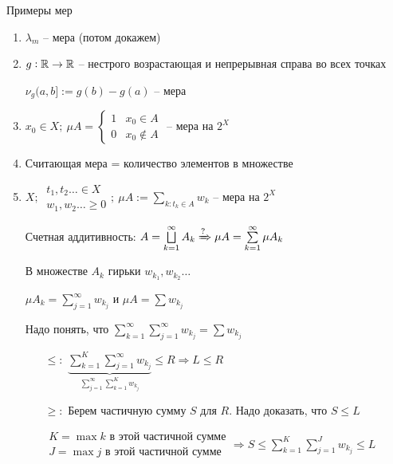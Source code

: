 \documentclass[12pt]{article}
\begin{document}
\begin{Example}{Примеры мер}
    \begin{enumerate}
        \item $\lambda_m$ -- мера (потом докажем)
        \item $g : \mathbb R \to \mathbb R$ -- нестрого возрастающая и непрерывная справа во всех точках
        
        $\nu_g(a, b] := g(b) - g(a)$ -- мера

        \item $x_0 \in X;\ \mu A = \begin{cases}
            1 & x_0 \in A \\
            0 & x_0 \notin A 
        \end{cases}$ -- мера на $2^X$

        \item Считающая мера = количество элементов в множестве
        \item $X;\ \begin{gathered}
            t_1, t_2 \ldots \in X \\
            w_1, w_2 \ldots \geq 0
        \end{gathered};\ \mu A := \sum\limits_{k : t_k \in A} w_k$ -- мера на $2^X$

        Счетная аддитивность: $A = \bigsqcup\limits_{k = 1}^\infty A_k \xRightarrow[]{?} \mu A = \sum\limits_{k = 1}^\infty \mu A_k$

        В множестве $A_k$ гирьки $w_{k_1}, w_{k_2} \ldots$

        $\mu A_k = \sum\limits_{j = 1}^\infty w_{k_j}$ и $\mu A = \sum w_{k_j}$
        
        Надо понять, что $\sum\limits_{k = 1}^\infty \sum\limits_{j = 1}^\infty w_{k_j} = \sum w_{k_j}$

        \begin{itemize}
            \item[$\leq :$] $\underbrace{\sum\limits_{k = 1}^K \sum\limits_{j = 1}^\infty w_{k_j}}_{\sum\limits_{j = 1}^\infty \sum\limits_{k = 1}^K w_{k_j}} \leq R \Rightarrow L \leq R$
            \item[$\geq :$] Берем частичную сумму $S$ для $R$. Надо доказать, что $S \leq L$
            
            $\begin{gathered}
                K = \max k \text{ в этой частичной сумме} \\
                J = \max j \text{ в этой частичной сумме}
            \end{gathered} \Rightarrow S \leq \sum\limits_{k = 1}^K \sum\limits_{j = 1}^J w_{k_j} \leq L$
        \end{itemize}
    \end{enumerate}
\end{Example}
\end{document}
